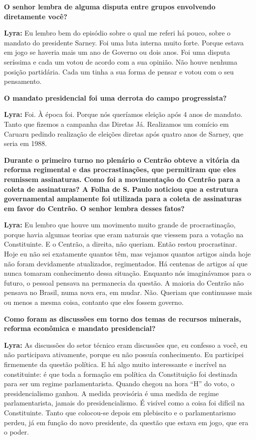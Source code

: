 \textbf{O senhor lembra de alguma disputa entre grupos envolvendo
diretamente você?}

\textbf{Lyra:} Eu lembro bem do episódio sobre o qual me referi há
pouco, sobre o mandato do presidente Sarney. Foi uma luta interna muito
forte. Porque estava em jogo se haveria mais um ano de Governo ou dois
anos. Foi uma disputa seríssima e cada um votou de acordo com a sua
opinião. Não houve nenhuma posição partidária. Cada um tinha a sua forma
de pensar e votou com o seu pensamento.

\textbf{O mandato presidencial foi uma derrota do campo progressista?}

\textbf{Lyra:} Foi. À época foi. Porque nós queríamos eleição após 4
anos de mandato. Tanto que fizemos a campanha das Diretas Já. Realizamos
um comício em Caruaru pedindo realização de eleições diretas após quatro
anos de Sarney, que seria em 1988.

\textbf{Durante o primeiro turno no plenário o Centrão obteve a vitória
da reforma regimental e das procrastinações, que permitiram que eles
reunissem assinaturas. Como foi a movimentação do Centrão para a coleta
de assinaturas? A Folha de S. Paulo noticiou que a estrutura
governamental amplamente foi utilizada para a coleta de assinaturas em
favor do Centrão. O senhor lembra desses fatos?}

\textbf{Lyra:} Eu lembro que houve um movimento muito grande de
procrastinação, porque havia algumas teorias que eram naturais que
viessem para a votação na Constituinte. E o Centrão, a direita, não
queriam. Então restou procrastinar. Hoje eu não sei exatamente quantos
têm, mas vejamos quantos artigos ainda hoje não foram devidamente
atualizados, regimentados. Há centenas de artigos aí que nunca tomaram
conhecimento dessa situação. Enquanto nós imaginávamos para o futuro, o
pessoal pensava na permanecia da questão. A maioria do Centrão não
pensava no Brasil, numa nova era, em mudar. Não. Queriam que continuasse
mais ou menos a mesma coisa, contanto que eles fossem governo.

\textbf{Como foram as discussões em torno dos temas de recursos
minerais, reforma econômica e mandato presidencial?}

\textbf{Lyra:} As discussões do setor técnico eram discussões que, eu
confesso a você, eu não participava ativamente, porque eu não possuía
conhecimento. Eu participei firmemente da questão política. E há algo
muito interessante e incrível na constituinte: é que toda a formação em
política da Constituição foi destinada para ser um regime
parlamentarista. Quando chegou na hora ``H'' do voto, o presidencialismo
ganhou. A medida provisória é uma medida de regime parlamentarista,
jamais do presidencialismo. É visível como a coisa foi difícil na
Constituinte. Tanto que colocou-se depois em plebiscito e o
parlamentarismo perdeu, já em função do novo presidente, da questão que
estava em jogo, que era o poder.

